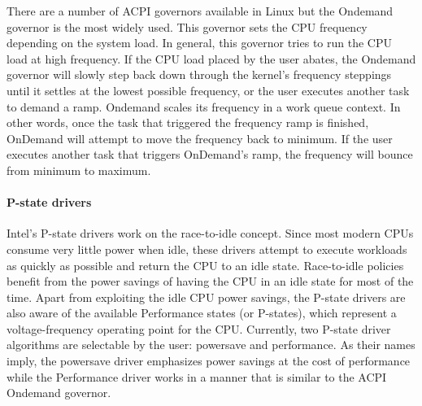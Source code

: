 There are a number of ACPI governors available in Linux but the Ondemand governor is the most widely used.
This governor sets the CPU frequency depending on the system load.  
In general, this governor tries to run the CPU load at high frequency. If the CPU load placed by the user abates, the Ondemand governor will slowly 
step back down through the kernel's frequency steppings until it settles at the lowest possible frequency, or the user executes another task to demand a ramp.
Ondemand scales its frequency in a work queue context. In other words, once the task that triggered the frequency ramp is finished, 
OnDemand will attempt to move the frequency back to minimum. If the user executes another task that triggers OnDemand's ramp, the frequency will bounce from minimum to maximum.

\paragraph{P-state drivers}
Intel's P-state drivers work on the race-to-idle concept. Since most modern CPUs consume very little power when idle, these drivers attempt to execute workloads as quickly 
as possible and return the CPU to an idle state. Race-to-idle policies benefit from the power savings of having the CPU in an idle state for most of the time. Apart from 
exploiting the idle CPU power savings, the P-state drivers are also aware of the available Performance states (or P-states), which represent a voltage-frequency operating point for the CPU. 
Currently, two P-state driver algorithms are selectable by the user: powersave and performance. As their names imply, the powersave driver emphasizes power savings at the cost of 
performance while the Performance driver works in a manner that is similar to the ACPI Ondemand governor.
 
